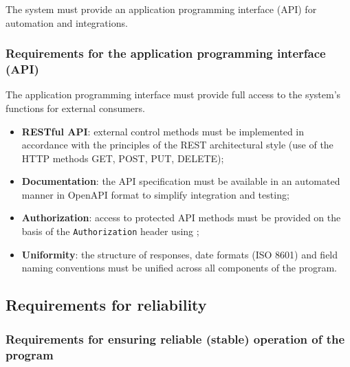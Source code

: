 \documentclass[12pt,a4paper]{extarticle}
\begin{document}
\begin{hseExample}
The system must provide an application programming interface (API) for automation and integrations.
\end{hseExample}

\subsubsection{Requirements for the application programming interface (API)}

\begin{hseExample}
The application programming interface must provide full access to the system's functions for external consumers.
\begin{itemize}[nosep, leftmargin=1.25cm]
    \item \textbf{RESTful API}: external control methods must be implemented in accordance with the principles of the REST architectural style (use of the HTTP methods GET, POST, PUT, DELETE);
    \item \textbf{Documentation}: the API specification must be available in an automated manner in OpenAPI format to simplify integration and testing;
    \item \textbf{Authorization}: access to protected API methods must be provided on the basis of the \texttt{Authorization} header using ;
    \item \textbf{Uniformity}: the structure of responses, date formats (ISO 8601) and field naming conventions must be unified across all components of the program.
\end{itemize}
\end{hseExample}

\subsection{Requirements for reliability}

\subsubsection{Requirements for ensuring reliable (stable) operation of the program}
\end{document}
